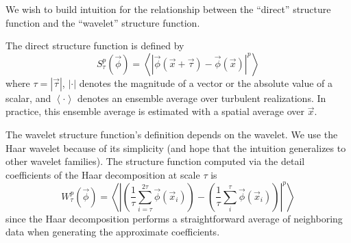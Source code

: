\documentclass{article}
\begin{document}

We wish to build intuition for the relationship between the ``direct'' structure function and the ``wavelet'' structure function.

The direct structure function is defined by
\begin{equation}
    S^p_\tau(\vec{\phi}) = \left< \left| \vec{\phi}(\vec{x} + \vec{\tau}) - \vec{\phi}(\vec{x}) \right|^p \right>
\end{equation}
where $\tau = |\vec{\tau}|$, $|\cdot|$ denotes the magnitude of a vector or the absolute value of a scalar, and $\left< \cdot \right>$ denotes an ensemble average over turbulent realizations.
In practice, this ensemble average is estimated with a spatial average over $\vec{x}$.

The wavelet structure function's definition depends on the wavelet.
We use the Haar wavelet because of its simplicity (and hope that the intuition generalizes to other wavelet families).
The structure function computed via the detail coefficients of the Haar decomposition at scale $\tau$ is
\begin{equation}
    W^p_\tau(\vec{\phi}) = \left< \left| \left(\frac{1}{\tau}\sum\limits_{i=\tau}^{2\tau} \vec{\phi}(\vec{x}_i)\right) - \left(\frac{1}{\tau}\sum\limits_{i}^{\tau} \vec{\phi}(\vec{x}_i)\right)\right|^p \right>
\end{equation}
since the Haar decomposition performs a straightforward average of neighboring data when generating the approximate coefficients.
\end{document}
